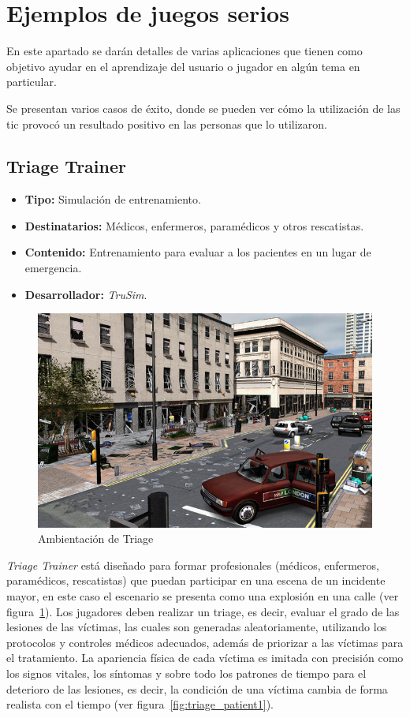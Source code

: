 \section{Ejemplos de juegos serios}

En este apartado se darán detalles de varias aplicaciones que
tienen como objetivo ayudar en el aprendizaje del usuario o jugador en algún
tema en particular.

Se presentan varios casos de éxito, donde se pueden ver cómo la utilización de
las \Gls{tic} provocó un resultado positivo en las personas que lo
utilizaron.

\subsection{Triage Trainer}

\begin{itemize}
\item \textbf{Tipo:} Simulación de entrenamiento.
\item \textbf{Destinatarios:} Médicos, enfermeros, paramédicos y otros
    rescatistas.
\item \textbf{Contenido:} Entrenamiento para evaluar a los pacientes en un lugar de
  emergencia.
\item \textbf{Desarrollador:} \emph{TruSim}.
\end{itemize}

\begin{figure}[ht!]
\centering
\includegraphics[scale=0.4]{tics/images/triage.png}
\caption{Ambientación de Triage}
\label{fig:triage}
\end{figure}

\emph{Triage Trainer} está diseñado para formar profesionales (médicos, enfermeros,
paramédicos, rescatistas) que puedan participar en una escena de un incidente
mayor, en este caso el escenario se presenta como una explosión en una calle
(ver figura~\ref{fig:triage}). Los jugadores deben realizar un triage, es decir, evaluar
el grado de las lesiones de las víctimas, las cuales son generadas aleatoriamente,
utilizando los protocolos y controles médicos adecuados, además de priorizar a las
víctimas para el tratamiento. La apariencia física de cada víctima es imitada con
precisión como los signos vitales, los síntomas y sobre todo los patrones de tiempo
para el deterioro de las lesiones, es decir, la condición de una víctima cambia de
forma realista con el tiempo (ver figura~\ref{fig:triage_patient1}).

